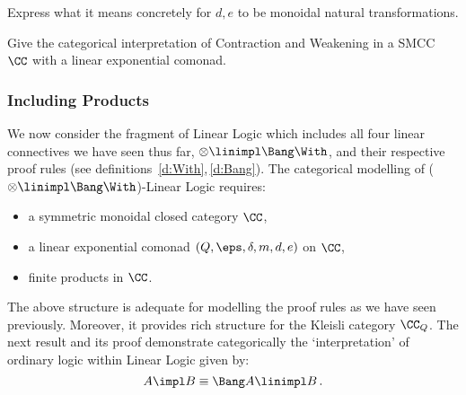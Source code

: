 \documentclass[12pt]{article}
\begin{document}
\begin{myexercise}
Express what it means concretely for $d,e$ to be monoidal natural transformations.
\end{myexercise}
\begin{myexercise}
Give the categorical interpretation of Contraction and Weakening in a SMCC $\CC$ with a linear exponential comonad.
\end{myexercise}

\subsubsection{Including Products}

We now consider the fragment of Linear Logic which includes all four linear connectives we have seen thus far, \ie $\otimes\linimpl\Bang\With$, and
their respective proof rules (see definitions~\ref{d:With},\,\ref{d:Bang}). The categorical modelling of ($\otimes\linimpl\Bang\With$)-Linear Logic
requires:
\begin{itemize}
 \item a symmetric monoidal closed category $\CC$,
 \item a linear exponential comonad $(Q,\eps,\delta,m,d,e)$ on $\CC$,
 \item finite products in $\CC$.
\end{itemize}
The above structure is adequate for modelling the proof rules as we have seen previously. Moreover, it provides rich structure for the Kleisli category $\CC_Q$. The next result and its proof demonstrate categorically the `interpretation' of ordinary logic within Linear Logic given by:
\[ A\impl B \equiv \Bang A\linimpl B\,. \]
\end{document}
